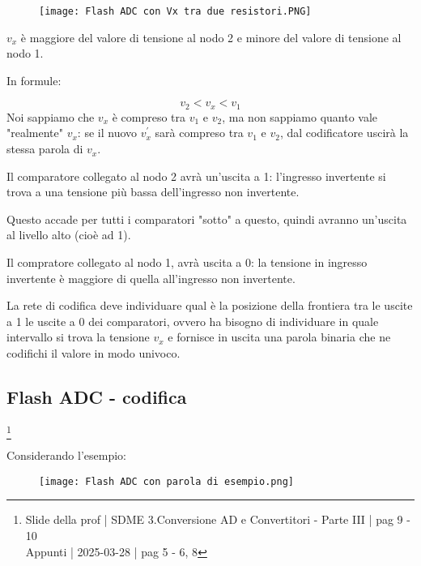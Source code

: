 \begin{figure}[h]
    \centering
    \texttt{[image: Flash ADC con Vx tra due resistori.PNG]}
\end{figure}

$v_x$ è maggiore del valore di tensione al nodo 2 e minore del valore di tensione al nodo 1. \newline 

In formule: 

{
    \Large 
    \begin{equation}
        v_2 < v_x < v_1
    \end{equation}
}
Noi sappiamo che $v_x$ è compreso tra $v_1$ e $v_2$, ma non sappiamo quanto vale "realmente" $v_x$: 
se il nuovo $v_x ^{'}$ sarà compreso tra $v_1$ e $v_2$, dal codificatore uscirà la stessa parola di $v_x$. \newline 

Il comparatore collegato al nodo 2 avrà un'uscita a 1: 
l'ingresso invertente si trova a una tensione più bassa dell'ingresso non invertente. \newline 

Questo accade per tutti i comparatori "sotto" a questo, quindi avranno un'uscita al livello alto (cioè ad 1). \newline 

Il compratore collegato al nodo 1, avrà uscita a 0: 
la tensione in ingresso invertente è maggiore di quella all'ingresso non invertente. \newline 


La rete di codifica deve individuare qual è la posizione della frontiera tra le uscite a 1 le uscite a 0 dei comparatori, 
ovvero ha bisogno di individuare in quale intervallo si trova la tensione $v_x$ e fornisce in uscita una parola binaria che ne codifichi il valore in modo univoco. \newline 

\newpage 

\subsection{Flash ADC - codifica}
\footnote{Slide della prof | SDME 3.Conversione AD e Convertitori - Parte III | pag 9 - 10 \\  
Appunti | 2025-03-28 | pag 5 - 6, 8}

Considerando l'esempio: 

\begin{figure}[h]
    \centering
    \texttt{[image: Flash ADC con parola di esempio.png]}
\end{figure}

